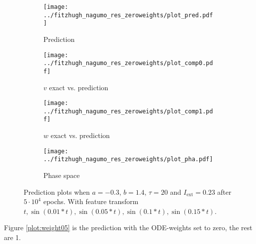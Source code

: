 \documentclass[a4paper]{article}
\begin{document}
\begin{figure}[H]
	\centering 
	\begin{subfigure}[b]{0.47\textwidth}
		\centering
		\texttt{[image: ../fitzhugh\_nagumo\_res\_zeroweights/plot\_pred.pdf]}
		\caption{Prediction}
		\label{fig:weight04a}
	\end{subfigure}
	\begin{subfigure}[b]{0.47\textwidth}
		\centering
		\texttt{[image: ../fitzhugh\_nagumo\_res\_zeroweights/plot\_comp0.pdf]}
		\caption{$v$ exact vs. prediction}
		\label{fig:weight04b}
	\end{subfigure}
	\begin{subfigure}[b]{0.47\textwidth}
		\centering
		\texttt{[image: ../fitzhugh\_nagumo\_res\_zeroweights/plot\_comp1.pdf]}
		\caption{$w$ exact vs. prediction}
		\label{fig:weight04c}
	\end{subfigure}
	\begin{subfigure}[b]{0.47\textwidth}
		\centering
		\texttt{[image: ../fitzhugh\_nagumo\_res\_zeroweights/plot\_pha.pdf]}
		\caption{Phase space}
		\label{fig:weight04d}
	\end{subfigure}
	\caption{Prediction plots when $a=-0.3$, $b=1.4$, $\tau=20$ and $ I_{\text{ext}}=0.23$ after $5\cdot10^4$ epochs. With feature transform $t, \sin(0.01 * t), \sin(0.05 * t), \sin(0.1 * t), \sin(0.15 * t)$.}
	\label{plot:weight04}
\end{figure}


Figure \ref{plot:weight05} is the prediction with the ODE-weights set to zero, the rest are 1.
\end{document}
